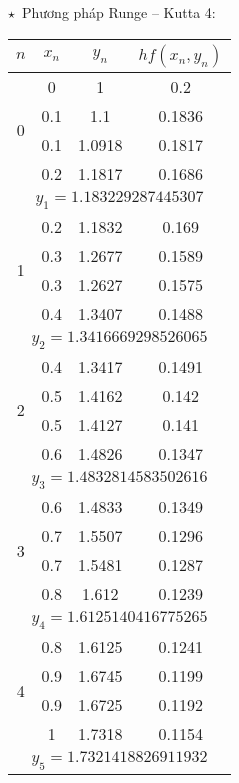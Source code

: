 $\star$~Phương pháp Runge – Kutta 4:
\begin{longtable}{|c|c|c|c|}\hline
	$n$                & $x_n$ & $y_n$  & $hf(x_n, y_n)$ \\ \hline
	\endhead
	\multirow{4}{*}{0} & 0     & 1      & 0.2        \\ \cline{2-4} 
	                   & 0.1   & 1.1    & 0.1836     \\ \cline{2-4} 
	                   & 0.1   & 1.0918 & 0.1817     \\ \cline{2-4} 
	                   & 0.2   & 1.1817 & 0.1686     \\ \hline
	\multicolumn{4}{|c|}{$y_1 = 1.183229287445307$}    \\ \hline
	\multirow{4}{*}{1} & 0.2   & 1.1832 & 0.169      \\ \cline{2-4} 
	                   & 0.3   & 1.2677 & 0.1589     \\ \cline{2-4} 
	                   & 0.3   & 1.2627 & 0.1575     \\ \cline{2-4} 
	                   & 0.4   & 1.3407 & 0.1488     \\ \hline
	\multicolumn{4}{|c|}{$y_2 = 1.3416669298526065$}   \\ \hline
	\multirow{4}{*}{2} & 0.4   & 1.3417 & 0.1491     \\ \cline{2-4} 
	                   & 0.5   & 1.4162 & 0.142      \\ \cline{2-4} 
	                   & 0.5   & 1.4127 & 0.141      \\ \cline{2-4} 
	                   & 0.6   & 1.4826 & 0.1347     \\ \hline
	\multicolumn{4}{|c|}{$y_3 = 1.4832814583502616$}   \\ \hline
	\multirow{4}{*}{3} & 0.6   & 1.4833 & 0.1349     \\ \cline{2-4} 
	                   & 0.7   & 1.5507 & 0.1296     \\ \cline{2-4} 
	                   & 0.7   & 1.5481 & 0.1287     \\ \cline{2-4} 
	                   & 0.8   & 1.612  & 0.1239     \\ \hline
	\multicolumn{4}{|c|}{$y_4 = 1.6125140416775265$}   \\ \hline
	\multirow{4}{*}{4} & 0.8   & 1.6125 & 0.1241     \\ \cline{2-4} 
	                   & 0.9   & 1.6745 & 0.1199     \\ \cline{2-4} 
	                   & 0.9   & 1.6725 & 0.1192     \\ \cline{2-4} 
	                   & 1     & 1.7318 & 0.1154     \\ \hline
	\multicolumn{4}{|c|}{$y_5 = 1.7321418826911932$}   \\ \hline
\end{longtable}


